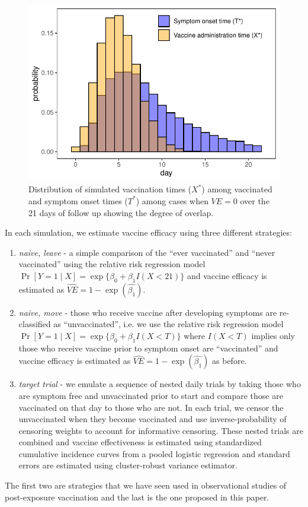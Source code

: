 \documentclass[11pt]{article}
\begin{document}
\begin{figure}[t]
    \centering
    \includegraphics{../3_figures/dist.pdf}
    \caption{Distribution of simulated vaccination times ($X^*$) among vaccinated and symptom onset times ($T^*$) among cases when $VE = 0$ over the 21 days of follow up showing the degree of overlap.}
    \label{fig:example_overlap}
\end{figure}

In each simulation, we estimate vaccine efficacy using three different strategies:
\begin{enumerate}
    \item \textit{naive, leave} - a simple comparison of the ``ever vaccinated'' and ``never vaccinated'' using the relative risk regression model $\Pr[Y = 1 \mid X] = \operatorname{exp}\{\beta_0 + \beta_1 I(X < 21)\}$ and vaccine efficacy is estimated as $\widehat{VE} = 1 - \exp(\widehat{\beta_1})$.
    \item \textit{naive, move} - those who receive vaccine after developing symptoms are re-classified as ``unvaccinated'', i.e. we use the relative risk regression model $\Pr[Y = 1 \mid X] = \operatorname{exp}\{\beta_0 + \beta_1 I(X < T)\}$ where $I(X<T)$ implies only those who receive vaccine prior to symptom onset are ``vaccinated'' and vaccine efficacy is estimated as $\widehat{VE} = 1 - \exp(\widehat{\beta_1})$ as before.
    \item \textit{target trial} - we emulate a sequence of nested daily trials by taking those who are symptom free and unvaccinated prior to start and compare those are vaccinated on that day to those who are not. In each trial, we censor the unvaccinated when they become vaccinated and use inverse-probability of censoring weights to account for informative censoring. These nested trials are combined and vaccine effectiveness is estimated using standardized cumulative incidence curves from a pooled logistic regression and standard errors are estimated using cluster-robust variance estimator.
\end{enumerate}
The first two are strategies that we have seen used in observational studies of post-exposure vaccination and the last is the one proposed in this paper.
\end{document}
